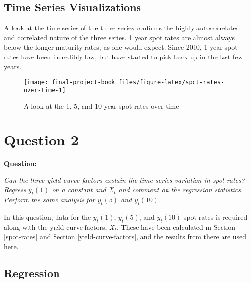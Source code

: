 \documentclass[openany]{book}
\theoremstyle{definition}
\theoremstyle{definition}
\theoremstyle{definition}
\theoremstyle{remark}
\begin{document}
\normalsize

\hypertarget{time-series-visualizations}{%
\section{Time Series Visualizations}\label{time-series-visualizations}}

A look at the time series of the three series confirms the highly
autocorrelated and correlated nature of the three series. 1 year spot
rates are almost always below the longer maturity rates, as one would
expect. Since 2010, 1 year spot rates have been incredibly low, but have
started to pick back up in the last few years.

\small

\begin{figure}[H]

{\centering \texttt{[image: final-project-book\_files/figure-latex/spot-rates-over-time-1]} 

}

\caption{A look at the 1, 5, and 10 year spot rates over time}\label{fig:spot-rates-over-time}
\end{figure}

\normalsize

\small

\normalsize

\hypertarget{q2}{%
\chapter{Question 2}\label{q2}}

\textbf{Question:}

\emph{Can the three yield curve factors explain the time-series
variation in spot rates? Regress \(y_t(1)\) on a constant and \(X_t\)
and comment on the regression statistics. Perform the same analysis for
\(y_t(5)\) and \(y_t(10)\).}

\small

\normalsize

In this question, data for the \(y_t(1)\), \(y_t(5)\), and \(y_t(10)\)
spot rates is required along with the yield curve factors, \(X_t\).
These have been calculated in Section \ref{spot-rates} and Section
\ref{yield-curve-factors}, and the results from there are used here.

\small

\normalsize

\hypertarget{regression}{%
\section{Regression}\label{regression}}
\end{document}
